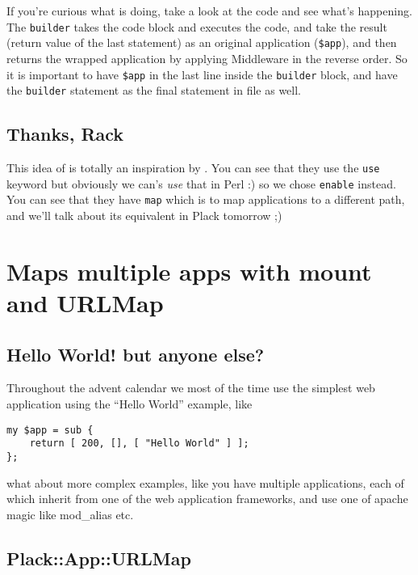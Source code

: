 If you're curious what  is doing, take a look at the code
and see what's happening. The \lstinline!builder! takes the code block
and executes the code, and take the result (return value of the last
statement) as an original application (\lstinline!$app!), and then
returns the wrapped application by applying Middleware in the reverse
order. So it is important to have \lstinline!$app! in the last line
inside the \lstinline!builder! block, and have the \lstinline!builder!
statement as the final statement in  file as well.

\section{Thanks, Rack}\label{thanks-rack}

This idea of  is totally an inspiration by
\href{http://m.onkey.org/2008/11/18/ruby-on-rack-2-rack-builder}{}.
You can see that they use the \lstinline!use! keyword but obviously we
can's \emph{use} that in Perl :) so we chose \lstinline!enable! instead.
You can see that they have \lstinline!map! which is to map applications
to a different path, and we'll talk about its equivalent in Plack
tomorrow ;)

\chapter{Maps multiple apps with mount and
URLMap}\label{day-12-maps-multiple-apps-with-mount-and-urlmap}

\section{Hello World! but anyone
else?}\label{hello-world-but-anyone-else}

Throughout the advent calendar we most of the time use the simplest web
application using the ``Hello World'' example, like

\begin{lstlisting}
my $app = sub {
    return [ 200, [], [ "Hello World" ] ];
};
\end{lstlisting}
%
what about more complex examples, like you have multiple applications,
each of which inherit from one of the web application frameworks, and
use one of apache magic like mod\_alias etc.

\section{Plack::App::URLMap}\label{plackappurlmap}

